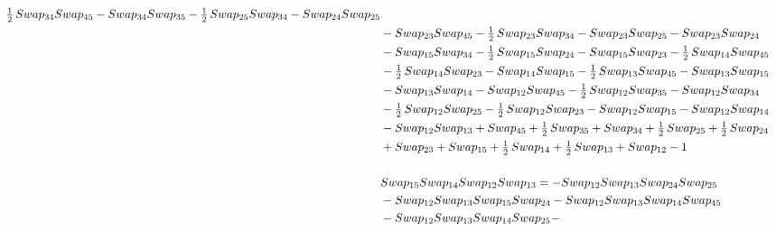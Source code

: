 \documentclass[10pt,a4paper]{amsart}
\begin{document}
\begin{align*}
        \tfrac12\,\textnormal{Swap}_{34} \textnormal{Swap}_{45} - \textnormal{Swap}_{34} \textnormal{Swap}_{35} - \tfrac12\,\textnormal{Swap}_{25} \textnormal{Swap}_{34} - \textnormal{Swap}_{24} \textnormal{Swap}_{25}\\ & - \textnormal{Swap}_{23} \textnormal{Swap}_{45} - \tfrac12\,\textnormal{Swap}_{23} \textnormal{Swap}_{34} -
        \textnormal{Swap}_{23} \textnormal{Swap}_{25} - \textnormal{Swap}_{23} \textnormal{Swap}_{24}\\ & - \textnormal{Swap}_{15} \textnormal{Swap}_{34} - \tfrac12\,\textnormal{Swap}_{15} \textnormal{Swap}_{24} - \textnormal{Swap}_{15} \textnormal{Swap}_{23} - \tfrac12\,\textnormal{Swap}_{14} \textnormal{Swap}_{45}\\ & -
        \tfrac12\,\textnormal{Swap}_{14} \textnormal{Swap}_{23} - \textnormal{Swap}_{14} \textnormal{Swap}_{15} - \tfrac12\,\textnormal{Swap}_{13} \textnormal{Swap}_{45} - \textnormal{Swap}_{13} \textnormal{Swap}_{15}\\ & - \textnormal{Swap}_{13} \textnormal{Swap}_{14} - \textnormal{Swap}_{12} \textnormal{Swap}_{45} -
        \tfrac12\,\textnormal{Swap}_{12} \textnormal{Swap}_{35} - \textnormal{Swap}_{12} \textnormal{Swap}_{34}\\ & - \tfrac12\,\textnormal{Swap}_{12} \textnormal{Swap}_{25} - \tfrac12\,\textnormal{Swap}_{12} \textnormal{Swap}_{23} - \textnormal{Swap}_{12} \textnormal{Swap}_{15} - \textnormal{Swap}_{12} \textnormal{Swap}_{14}\\ & -
        \textnormal{Swap}_{12} \textnormal{Swap}_{13} + \textnormal{Swap}_{45} + \tfrac12\,\textnormal{Swap}_{35} + \textnormal{Swap}_{34} + \tfrac12\,\textnormal{Swap}_{25} + \tfrac12\,\textnormal{Swap}_{24}\\ & + \textnormal{Swap}_{23} + \textnormal{Swap}_{15} + \tfrac12\,\textnormal{Swap}_{14}
        + \tfrac12\,\textnormal{Swap}_{13} + \textnormal{Swap}_{12} - 1\\
        \\
        &\textnormal{Swap}_{15}   \textnormal{Swap}_{14}   \textnormal{Swap}_{12}   \textnormal{Swap}_{13} = -\textnormal{Swap}_{12} \textnormal{Swap}_{13} \textnormal{Swap}_{24} \textnormal{Swap}_{25}\\ & - \textnormal{Swap}_{12} \textnormal{Swap}_{13} \textnormal{Swap}_{15} \textnormal{Swap}_{24} - \textnormal{Swap}_{12} \textnormal{Swap}_{13} \textnormal{Swap}_{14} \textnormal{Swap}_{45}\\ & - \textnormal{Swap}_{12} \textnormal{Swap}_{13} \textnormal{Swap}_{14} \textnormal{Swap}_{25} -

\end{align*}
\end{document}
